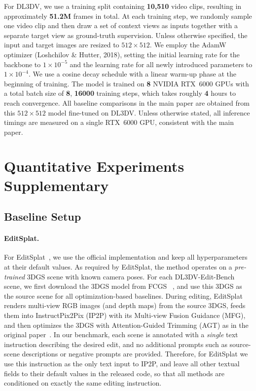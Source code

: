 For DL3DV, we use a training split containing \textbf{10{,}510} video clips,
resulting in approximately \textbf{51.2M} frames in total. At each training
step, we randomly sample one video clip and then draw a set of context views
as inputs together with a separate target view as ground-truth supervision.
Unless otherwise specified, the input and target images are resized to
$512 \times 512$. We employ the AdamW optimizer (Loshchilov \& Hutter, 2018),
setting the initial learning rate for the backbone to $1 \times 10^{-5}$ and
the learning rate for all newly introduced parameters to $1 \times 10^{-4}$.
We use a cosine decay schedule with a linear warm-up phase at the beginning
of training. The model is trained on \textbf{8} NVIDIA RTX~6000 GPUs with a
total batch size of \textbf{8}, \textbf{16000} training steps, which takes roughly \textbf{4} hours to reach convergence. All baseline comparisons in the main paper are obtained from this $512 \times 512$ model fine-tuned on DL3DV.
Unless otherwise stated, all inference timings are measured on a single RTX~6000 GPU, consistent with the main paper.


\section{Quantitative Experiments Supplementary}
\label{sec:quantitative-experiments}
\subsection{Baseline Setup}

\paragraph{EditSplat.}
For EditSplat~\cite{lee2025editsplatmultiviewfusionattentionguided}, we use the official implementation and keep all hyperparameters at their default values.
As required by EditSplat, the method operates on a \emph{pre-trained} 3DGS scene with known camera poses.
For each DL3DV-Edit-Bench scene, we first download the 3DGS model from FCGS ~\cite{chen2025fastfeedforward3dgaussian}, and use this 3DGS as the source scene for all optimization-based baselines.
During editing, EditSplat renders multi-view RGB images (and depth maps) from the source 3DGS, feeds them into InstructPix2Pix (IP2P) with its Multi-view Fusion Guidance (MFG), and then optimizes the 3DGS with Attention-Guided Trimming (AGT) as in the original paper~\cite{lee2025editsplatmultiviewfusionattentionguided}.
In our benchmark, each scene is annotated with a \emph{single} text instruction describing the desired edit, and no additional prompts such as source-scene descriptions or negative prompts are provided.
Therefore, for EditSplat we use this instruction as the only text input to IP2P, and leave all other textual fields to their default values in the released code, so that all methods are conditioned on exactly the same editing instruction.


